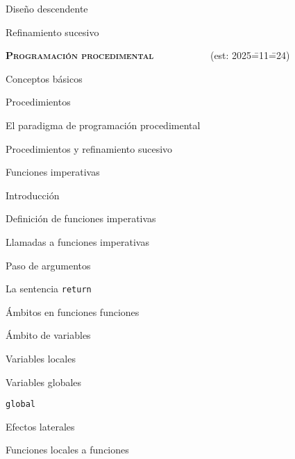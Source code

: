 \begin{longenum}
\begin{longenum}
\begin{longenum}
            \item Diseño descendente
            \item Refinamiento sucesivo
        \end{longenum}
    \end{longenum}
    \item \textbf{\textsc{Programación procedimental}} \ \ \ \ \ \ \ \ \ \ \ (est: 2025\==11\==24)
    \begin{longenum}
        \item Conceptos básicos
        \begin{longenum}
            \item Procedimientos
            \item El paradigma de programación procedimental
            \item Procedimientos y refinamiento sucesivo
        \end{longenum}
        \item Funciones imperativas
        \begin{longenum}
            \item Introducción
            \item Definición de funciones imperativas
            \item Llamadas a funciones imperativas
            \item Paso de argumentos
            \item La sentencia \texttt{return}
        \end{longenum}
        \item Ámbitos en funciones funciones
        \begin{longenum}
            \item Ámbito de variables
            \begin{longenum}
                \item Variables locales
                \item Variables globales
                \begin{longenum}
                    \item \texttt{global}
                    \item Efectos laterales
                \end{longenum}
            \end{longenum}
            \item Funciones locales a funciones
            \begin{longenum}

\end{longenum}
\end{longenum}
\end{longenum}
\end{longenum}
